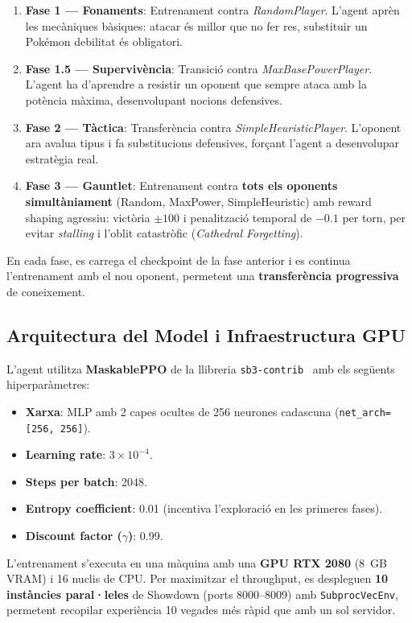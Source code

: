 \begin{enumerate}
    \item \textbf{Fase 1 — Fonaments}: Entrenament contra \textit{RandomPlayer}. L'agent aprèn les mecàniques bàsiques: atacar és millor que no fer res, substituir un Pokémon debilitat és obligatori.
    \item \textbf{Fase 1.5 — Supervivència}: Transició contra \textit{MaxBasePowerPlayer}. L'agent ha d'aprendre a resistir un oponent que sempre ataca amb la potència màxima, desenvolupant nocions defensives.
    \item \textbf{Fase 2 — Tàctica}: Transferència contra \textit{SimpleHeuristicPlayer}. L'oponent ara avalua tipus i fa substitucions defensives, forçant l'agent a desenvolupar estratègia real.
    \item \textbf{Fase 3 — Gauntlet}: Entrenament contra \textbf{tots els oponents simultàniament} (Random, MaxPower, SimpleHeuristic) amb reward shaping agressiu: victòria $\pm 100$ i penalització temporal de $-0.1$ per torn, per evitar \textit{stalling} i l'oblit catastròfic (\textit{Cathedral Forgetting}).
\end{enumerate}

En cada fase, es carrega el checkpoint de la fase anterior i es continua l'entrenament amb el nou oponent, permetent una \textbf{transferència progressiva} de coneixement.

\subsection{Arquitectura del Model i Infraestructura GPU}

L'agent utilitza \textbf{MaskablePPO} de la llibreria \texttt{sb3-contrib}~\cite{sb3_contrib} amb els següents hiperparàmetres:
\begin{itemize}
    \item \textbf{Xarxa}: MLP amb 2 capes ocultes de 256 neurones cadascuna (\texttt{net\_arch=[256, 256]}).
    \item \textbf{Learning rate}: $3 \times 10^{-4}$.
    \item \textbf{Steps per batch}: 2048.
    \item \textbf{Entropy coefficient}: 0.01 (incentiva l'exploració en les primeres fases).
    \item \textbf{Discount factor ($\gamma$)}: 0.99.
\end{itemize}

L'entrenament s'executa en una màquina amb una \textbf{GPU RTX 2080} (8~GB VRAM) i 16 nuclis de CPU. Per maximitzar el throughput, es despleguen \textbf{10 instàncies paral·leles} de Showdown (ports 8000--8009) amb \texttt{SubprocVecEnv}, permetent recopilar experiència 10 vegades més ràpid que amb un sol servidor.


